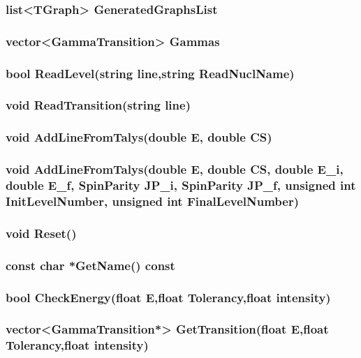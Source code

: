 \documentclass[a4paper,12pt]{extarticle}
\begin{document}
\subsubsection{list<TGraph> GeneratedGraphsList}

\subsubsection{vector<GammaTransition> Gammas}

\subsubsection{bool ReadLevel(string line,string ReadNuclName)}

\subsubsection{void ReadTransition(string line)}

\subsubsection{void AddLineFromTalys(double E, double CS)}

\subsubsection{void AddLineFromTalys(double E, double CS, double E\_i, double E\_f, SpinParity JP\_i, SpinParity JP\_f, unsigned int InitLevelNumber, unsigned int FinalLevelNumber)}

\subsubsection{void Reset()}

\subsubsection{const char *GetName()  const}

\subsubsection{bool CheckEnergy(float E,float Tolerancy,float intensity)}

\subsubsection{vector<GammaTransition*> GetTransition(float E,float Tolerancy,float intensity)}
\end{document}

